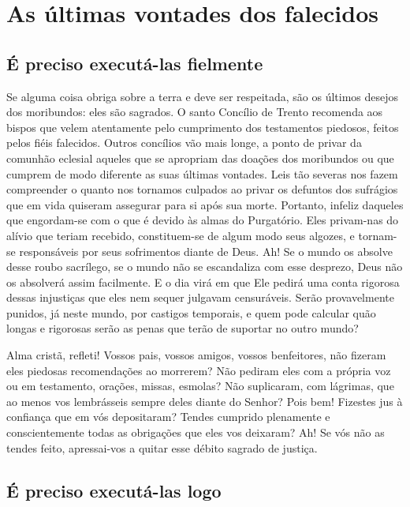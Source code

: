 \renewcommand{\thechapterdisplay}{Trigésimo dia}
\renewcommand{\thechapterrunner}{As últimas vontades dos falecidos}
\chapter[Trigésimo dia --- As últimas vontades dos falecidos]{As últimas vontades dos falecidos}
\section*{É preciso executá-las fielmente}

Se alguma coisa obriga sobre a terra e deve ser respeitada, são os últimos desejos dos moribundos: eles são sagrados. O santo Concílio de Trento recomenda aos bispos que velem atentamente pelo cumprimento dos testamentos piedosos, feitos pelos fiéis falecidos. Outros concílios vão mais longe, a ponto de privar da comunhão eclesial aqueles que se apropriam das doações dos moribundos ou que cumprem de modo diferente as suas últimas vontades. Leis tão severas nos fazem compreender o quanto nos tornamos culpados ao privar os defuntos dos sufrágios que em vida quiseram assegurar para si após sua morte. Portanto, infeliz daqueles que engordam-se com o que é devido às almas do Purgatório. Eles privam-nas do alívio que teriam recebido, constituem-se de algum modo seus algozes, e tornam-se responsáveis por seus sofrimentos diante de Deus. Ah! Se o mundo os absolve desse roubo sacrílego, se o mundo não se escandaliza com esse desprezo, Deus não os absolverá assim facilmente. E o dia virá em que Ele pedirá uma conta rigorosa dessas injustiças que eles nem sequer julgavam censuráveis. Serão provavelmente punidos, já neste mundo, por castigos temporais, e quem pode calcular quão longas e rigorosas serão as penas que terão de suportar no outro mundo?

Alma cristã, refleti! Vossos pais, vossos amigos, vossos benfeitores, não fizeram eles piedosas recomendações ao morrerem? Não pediram eles com a própria voz ou em testamento, orações, missas, esmolas? Não suplicaram, com lágrimas, que ao menos vos lembrásseis sempre deles diante do Senhor? Pois bem! Fizestes jus à confiança que em vós depositaram? Tendes cumprido plenamente e conscientemente todas as obrigações que eles vos deixaram? Ah! Se vós não as tendes feito, apressai-vos a quitar esse débito sagrado de justiça.


\section*{É preciso executá-las logo}

